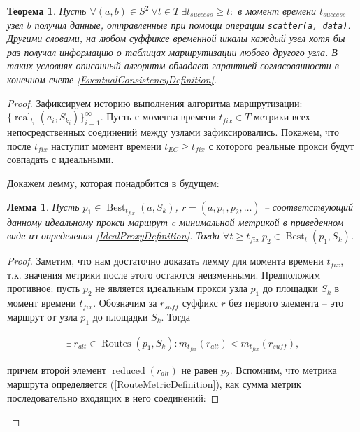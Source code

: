 \documentclass{article}
\theoremstyle{plain}
\newtheorem{theorem}{Теорема}[section]
\theoremstyle{plain}
\theoremstyle{plain}
\newtheorem{lemma}{Лемма}[section]
\theoremstyle{plain}
\theoremstyle{definition}
\theoremstyle{remark}
\theoremstyle{plain}
\DeclareMathOperator*{\real}{real}
\DeclareMathOperator*{\best}{Best}
\DeclareMathOperator*{\routes}{Routes}
\DeclareMathOperator*{\reduced}{reduced}
\begin{document}
\begin{theorem}
\label{RoutingEventualConsistencyTheorem}
    Пусть $\forall (a, b) \in S^2\ \forall t \in T\ \exists t_{success} \geq t :$ в момент времени $t_{success}$ узел $b$ получил данные, отправленные при помощи операции \texttt{scatter(a, data)}. Другими словами, на любом суффиксе временной шкалы каждый узел хотя бы раз получал информацию о таблицах маршрутизации любого другого узла. В таких условиях описанный алгоритм обладает гарантией согласованности в конечном счете \ref{EventualConsistencyDefinition}.
\end{theorem}
\begin{proof}
    Зафиксируем историю выполнения алгоритма маршрутизации: \\
    $\{\real_{t_i}(a_i, S_{k_i})\}_{i = 1}^{\infty}$. Пусть с момента времени $t_{fix} \in T$ метрики всех непосредственных соединений между узлами зафиксировались. Покажем, что после $t_{fix}$ наступит момент времени $t_{EC} \geq t_{fix}$ с которого реальные прокси будут совпадать с идеальными.
    
    Докажем лемму, которая понадобится в будущем:
    
    \begin{lemma}
    \label{IdealChain}
        Пусть $p_1 \in \best_{t_{fix}}(a, S_k)$, $r = (a, p_1, p_2, \ldots )$ -- соответствующий данному идеальному прокси маршрут c минимальной метрикой в приведенном виде из определения \ref{IdealProxyDefinition}. Тогда $\forall t \geq t_{fix}\ p_2 \in \best_t(p_1, S_k)$.
    \end{lemma}
    \begin{proof}
        Заметим, что нам достаточно доказать лемму для момента времени $t_{fix}$, т.к. значения метрики после этого остаются неизменными. Предположим противное: пусть $p_2$ не является идеальным прокси узла $p_1$ до площадки $S_k$ в момент времени $t_{fix}$. Обозначим за $r_{suff}$ суффикс $r$ без первого элемента -- это маршрут от узла $p_1$ до площадки $S_k$. Тогда
        
        \begin{equation*}
        \begin{aligned}
            \exists\ r_{alt} \in \routes(p_1, S_k) : m_{t_{fix}}(r_{alt}) < m_{t_{fix}}(r_{suff}),
        \end{aligned}
        \end{equation*}
        
        причем второй элемент $\reduced(r_{alt})$ не равен $p_2$. Вспомним, что метрика маршрута определяется (\ref{RouteMetricDefinition}), как сумма метрик последовательно входящих в него соединений:
        

\end{proof}
\end{proof}
\end{document}
